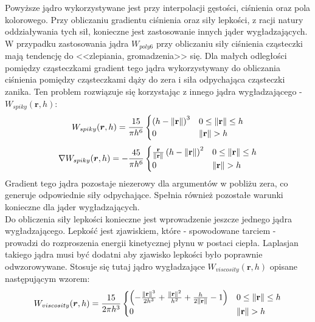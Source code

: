Powyższe jądro wykorzystywane jest przy interpolacji gęstości, ciśnienia oraz pola kolorowego. Przy obliczaniu gradientu ciśnienia oraz siły lepkości, z racji natury oddziaływania tych sił, konieczne jest zastosowanie innych jąder wygładzających.\\
\indent W przypadku zastosowania jądra $W_{poly6}$ przy obliczaniu siły ciśnienia cząsteczki mają tendencję do <<zlepiania, gromadzenia>> się. Dla małych odległości pomiędzy cząsteczkami gradient tego jądra wykorzystywany do obliczania ciśnienia pomiędzy cząsteczkami dąży do zera i siła odpychająca cząsteczki zanika. Ten problem rozwiązuje się korzystając z innego jądra wygładzającego - $W_{spiky}(\boldsymbol{r}, h)$:
\begin{equation}
W_{spiky}(\boldsymbol{r}, h) = {15 \over \pi h^6}
\begin{cases}
\left(h - \| \mathbf{r} \|\right)^3 & 0 \le \| \mathbf{r} \| \le h \\
0 & \| \mathbf{r} \| > h
\end{cases}
\end{equation}
\begin{equation}
\nabla W_{spiky}(\boldsymbol{r}, h) = -{45 \over \pi h^6}
\begin{cases}
{\mathbf{r} \over {\| \mathbf{r} \|}} \left(h - \| \mathbf{r} \|\right)^2 & 0 \le \| \mathbf{r} \| \le h \\
0 & \| \mathbf{r} \| > h
\end{cases}
\end{equation}
Gradient tego jądra pozostaje niezerowy dla argumentów w pobliżu zera, co generuje odpowiednie siły odpychające. Spełnia również pozostałe warunki konieczne dla jąder wygładzających.\\
\indent Do obliczenia siły lepkości konieczne jest wprowadzenie jeszcze jednego jądra wygładzającego. Lepkość jest zjawiskiem, które - spowodowane tarciem - prowadzi do rozproszenia energii kinetycznej płynu w postaci ciepła. Laplasjan takiego jądra musi być dodatni aby zjawisko lepkości było poprawnie odwzorowywane. Stosuje się tutaj jądro wygładzające $W_{viscosity}(\boldsymbol{r}, h)$ opisane następującym wzorem:
\begin{equation}
W_{viscosity}(\boldsymbol{r}, h) = {15 \over 2 \pi h^3}
\begin{cases}
\left( -{ {\| \mathbf{r} \|}^3 \over 2 h^3 } + { {\| \mathbf{r} \|}^2 \over h^2 } + { h \over 2 {\| \mathbf{r} \|} } - 1 \right) & 0 \le \| \mathbf{r} \| \le h \\
0 & \| \mathbf{r} \| > h
\end{cases}
\end{equation}

